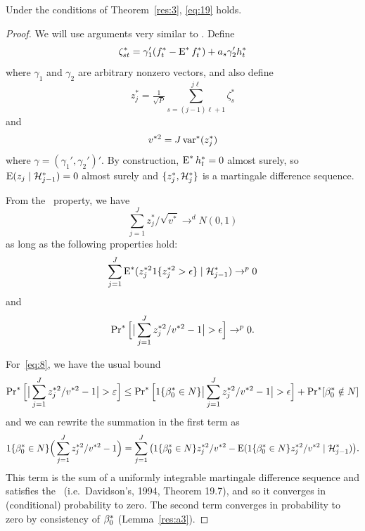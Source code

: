 \documentclass[12pt,fleqn]{article}
\begin{document}
\begin{lema}\label{lem-clt}
  Under the conditions of Theorem~\ref{res:3}, \eqref{eq:19} holds.
\end{lema}
\begin{proof}

  We will use arguments very similar to \cite{Cal:14}. Define
  \[
  \zeta_{st}^* = \gamma_1'(f_t^* - \operatorname{E}^* f_t^*) + a_s \gamma_2' h_t^*
  \]
  where $\gamma_1$ and $\gamma_2$ are arbitrary nonzero vectors, and
  also define
  \[
  z_j^* = \tfrac{1}{\sqrt{P}} \sum_{s=(j-1) \ell + 1}^{j\ell} \zeta_s^*
  \]
  and
  \[
  v^{*2} = J \operatorname{var}^*(z_j^*)
  \]
  where $\gamma = (\gamma_1', \gamma_2')'$. By construction, $\operatorname{E}^*
  h_t^* = 0$ almost surely, so $\operatorname{E}(z_j \mid \mathcal{H}_{j-1}^*) = 0$ almost
  surely and $\{z_j^*, \mathcal{H}_j^*\}$ is a martingale difference sequence.

  From the \mds\ property, we have
  \begin{equation*}
    \sum_{j=1}^J z_j^* / \sqrt{v^*} \to^d N(0, 1)
  \end{equation*}
  as long as the following properties hold:
  \begin{equation}\label{eq:7}
    \sum_{j=1}^J \operatorname{E}^*(z_j^{*2} 1\{z_j^{*2} > \epsilon\} \mid \mathcal{H}_{j-1}^*) \to^p 0
  \end{equation}
  and
  \begin{equation}\label{eq:8}
    \operatorname{Pr}^*\Big[ \big| \sum_{j=1}^J z_j^{*2}/v^{*2} - 1 \big| > \epsilon\Big] \to^p 0.
  \end{equation}

  For~\eqref{eq:8}, we have the usual bound
  \begin{equation*}
    \operatorname{Pr}^*\Big[ \big|\sum_{j=1}^J z_j^{*2}/v^{*2} - 1 \big| > \varepsilon\Big] \leq
    \operatorname{Pr}^*\Big[ 1\{\beta_0^* \in N\} \big| \sum_{j=1}^J z_j^{*2}/v^{*2} - 1 \big| > \epsilon \Big]
     + \operatorname{Pr}^*[ \beta_0^* \notin N ]
  \end{equation*}
  and we can rewrite the summation in the first term as
  \begin{equation*}
    1\{\beta_0^* \in N\} \Big( \sum_{j=1}^J z_j^{*2}/v^{*2} - 1 \Big)
    =  \sum_{j=1}^J \big(1\{\beta_0^* \in N\}z_j^{*2}/v^{*2} -
    \operatorname{E}(1\{\beta_0^* \in N\}z_j^{*2}/v^{*2} \mid \mathcal{H}_{j-1}^*) \big).
   \end{equation*}
   This term is the sum of a uniformly integrable martingale
   difference sequence and satisfies the \lln\ (i.e.\ Davidson's, 1994,
   Theorem 19.7), and so it converges in (conditional) probability to
   zero.  The second term converges in probability to zero by
   consistency of $\beta_0^*$ (Lemma~\ref{res:a3}).


\end{proof}
\end{document}
